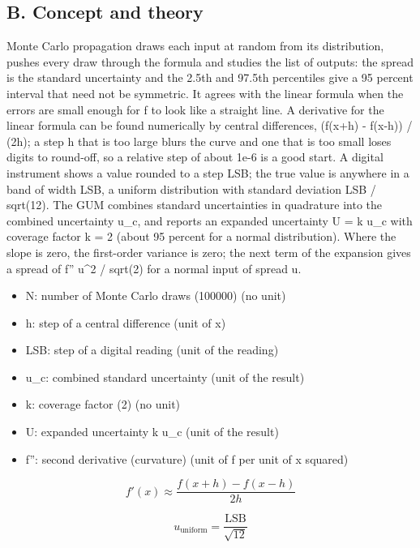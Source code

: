 \documentclass[11pt,a4paper]{article}
\begin{document}
\subsection*{B. Concept and theory}
Monte Carlo propagation draws each input at random from its distribution, pushes every draw through the formula and studies the list of outputs: the spread is the standard uncertainty and the 2.5th and 97.5th percentiles give a 95 percent interval that need not be symmetric. It agrees with the linear formula when the errors are small enough for f to look like a straight line. A derivative for the linear formula can be found numerically by central differences, (f(x+h) - f(x-h)) / (2h); a step h that is too large blurs the curve and one that is too small loses digits to round-off, so a relative step of about 1e-6 is a good start. A digital instrument shows a value rounded to a step LSB; the true value is anywhere in a band of width LSB, a uniform distribution with standard deviation LSB / sqrt(12). The GUM combines standard uncertainties in quadrature into the combined uncertainty u\_c, and reports an expanded uncertainty U = k u\_c with coverage factor k = 2 (about 95 percent for a normal distribution). Where the slope is zero, the first-order variance is zero; the next term of the expansion gives a spread of \textbar{}f''\textbar{} u\textasciicircum{}2 / sqrt(2) for a normal input of spread u.

\begin{itemize}[nosep]
\item N: number of Monte Carlo draws (100000) (no unit)
\item h: step of a central difference (unit of x)
\item LSB: step of a digital reading (unit of the reading)
\item u\_c: combined standard uncertainty (unit of the result)
\item k: coverage factor (2) (no unit)
\item U: expanded uncertainty k u\_c (unit of the result)
\item f'': second derivative (curvature) (unit of f per unit of x squared)
\end{itemize}

\begin{equation*}
f'(x)\approx\frac{f(x+h)-f(x-h)}{2h}
\end{equation*}

\begin{equation*}
u_{\text{uniform}}=\frac{\mathrm{LSB}}{\sqrt{12}}
\end{equation*}
\end{document}
